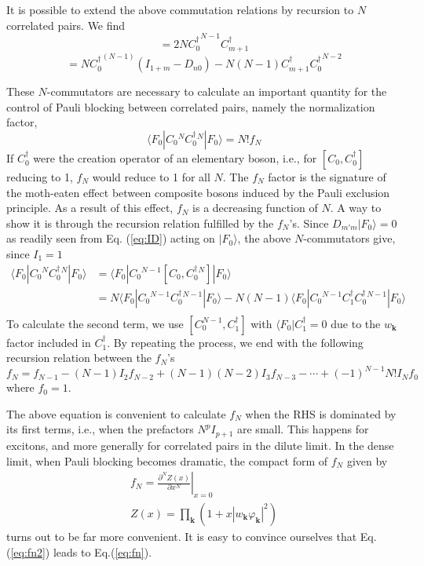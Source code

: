\documentclass[aps,prb,preprint,groupedaddress,amsmath]{revtex4-1}
\newcommand{\vk}{\ensuremath{\mathbf{k}}}
\newcommand{\dg}{\ensuremath{\dagger}}
\begin{document}
  It is possible to extend the above commutation relations by recursion to $N$ correlated pairs.  We find
\begin{equation}
[{D}_{m0},C^\dg_{0}{}^N]=2N{C^\dg_{0}}^{N-1}C^\dg_{m+1}
\end{equation}
\begin{equation}
[{C}_{m},C^\dg_{0}{}^N]=N{C^\dg_0}^{(N-1)}(I_{1+m}-D_{n0})-N(N-1)C^\dg_{m+1}{C^\dg_{0}}^{N-2}
\end{equation}

These $N$-commutators are necessary to calculate an important quantity for the control of Pauli blocking between correlated pairs, namely the normalization factor,
\begin{equation}
\langle{}F_0|{C_0^{ }}{}^N{C_0^\dg}{}^N|F_0{\rangle}=N!f_N
\end{equation}
If $C^\dg_0$ were the creation operator of an elementary boson, i.e., for $[C_0,C^\dg_0]$ reducing to 1,  $f_N$ would reduce to 1 for all $N$.  The $f_N$ factor is the signature of the moth-eaten effect between composite bosons induced by the Pauli exclusion principle.  As a result of this effect, $f_N$ is a decreasing function of $N$. A way to show it is through  the recursion relation fulfilled by the $f_N$'s.  Since $D_{m'm}|F_0\rangle=0 $  as readily seen from Eq. (\ref{eq:ID}) acting on $|F_0\rangle$, the above $N$-commutators give,  since $I_1=1$ 
\begin{equation}
\begin{split} 
\langle{}F_0|{C_0^{ }}{}^N{C_0^\dg}{}^N|F_0{\rangle}&
	=\langle{}F_0|{C_0^{ }}{}^{N-1}[C_0,{C_0^\dg}{}^N]|F_0{\rangle}\\
	&=N\langle{}F_0|{C_0^{ }}{}^{N-1}{C_0^\dg}{}^{N-1}|F_0{\rangle}
	-N(N-1)\langle{}F_0|{C_0^{ }}{}^{N-1}C_1^\dg{C_0^\dg}{}^{N-1}|F_0{\rangle}\\
\end{split}
\end{equation}
To calculate the second term, we  use $[C_0^{N-1},C_1^\dg]$ with $\langle{}F_0|C^\dg_1=0$ due to the $w_\vk$ factor included in $C^\dg_1$. By repeating the process, we end with the following recursion relation between the $f_N$'s 
\begin{equation}\label{eq:fn}
f_N=f_{N-1}-(N-1)I_2f_{N-2}+(N-1)(N-2)I_3f_{N-3}-\cdots+(-1)^{N-1}N!I_Nf_0
\end{equation}
where $f_0=1$. 

The above equation is convenient to calculate $f_N$ when the RHS is dominated by its first terms, i.e., when the prefactors $N^pI_{p+1}$ are small.  This happens for excitons,  and more generally for correlated pairs in the dilute limit.  In the dense limit, when Pauli blocking becomes dramatic, the compact form of  $f_N$   given by 
\begin{equation}\label{eq:fn2}
\begin{split}
f_N=\left.\frac{\partial^NZ(x)}{\partial{x^N}}\right|_{x=0}\\
Z(x)=\prod_\vk(1+x|w_\vk\varphi_\vk|^2)
\end{split}
\end{equation}
turns out to be far more convenient. It is easy to convince ourselves that Eq.(\ref{eq:fn2}) leads to Eq.(\ref{eq:fn}).
\end{document}

